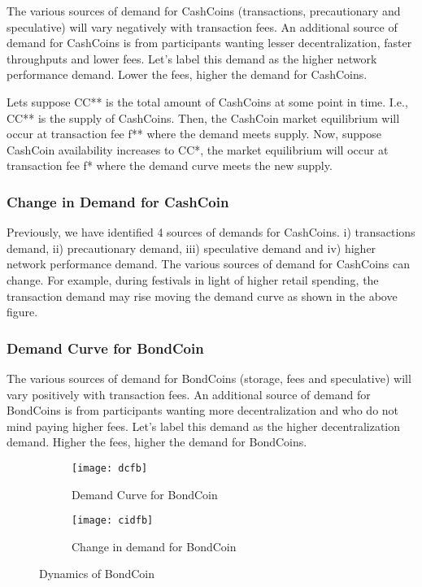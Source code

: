 The various sources of demand for CashCoins (transactions, precautionary and speculative) will vary negatively with transaction fees. An additional source of demand for CashCoins is from participants wanting lesser decentralization, faster throughputs and lower fees. Let's label this demand as the higher network performance demand. Lower the fees, higher the demand for CashCoins.

Lets suppose CC** is the total amount of CashCoins at some point in time. I.e., CC** is the supply of CashCoins. Then, the CashCoin market equilibrium will occur at transaction fee f** where the demand meets supply. Now, suppose CashCoin availability increases to CC*, the market equilibrium will occur at transaction fee f* where the demand curve meets the new supply.

\subsubsection{Change in Demand for CashCoin}

Previously, we have identified 4 sources of demands for CashCoins. i) transactions demand, ii) precautionary demand, iii) speculative demand and iv) higher network performance demand. The various sources of demand for CashCoins can change. For example, during festivals in light of higher retail spending, the transaction demand may rise moving the demand curve as shown in the above figure.

\subsubsection{Demand Curve for BondCoin}

The various sources of demand for BondCoins (storage, fees and speculative) will vary positively with transaction fees. An additional source of demand for BondCoins is from participants wanting more decentralization and who do not mind paying higher fees. Let’s label this demand as the higher decentralization demand. Higher the fees, higher the demand for BondCoins.

\begin{figure}
     \centering
     \begin{subfigure}[b]{\linewidth}
         \centering
         \texttt{[image: dcfb]}
         \caption{Demand Curve for BondCoin}
         \label{fig31}
     \end{subfigure}
     \vspace{1mm}
     \begin{subfigure}[b]{\linewidth}
         \centering
         \texttt{[image: cidfb]}
         \caption{Change in demand for BondCoin}
         \label{fig32}
     \end{subfigure}
        \caption{Dynamics of BondCoin}
        \label{fig3}
\end{figure}

